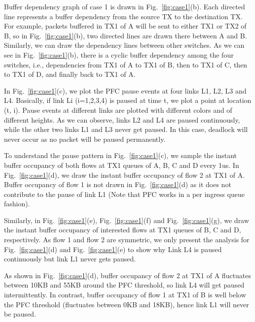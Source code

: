Buffer dependency graph of case 1 is drawn in Fig.~\ref{fig:case1}(b). Each directed line represents a buffer dependency from the source TX to the destination TX. For example, packets buffered in TX1 of A will be sent to either TX1 or TX2 of B, so in Fig.~\ref{fig:case1}(b), two directed lines are drawn there between A and B. Similarly, we can draw the dependency lines between other switches. As we can see in Fig.~\ref{fig:case1}(b), there is a cyclic buffer dependency among the four switches, i.e., dependencies from TX1 of A to TX1 of B, then to TX1 of C, then to TX1 of D, and finally back to TX1 of A.

In Fig.~\ref{fig:case1}(c), we plot the PFC pause events at four links L1, L2, L3 and L4. Basically, if link Li (i=1,2,3,4) is paused at time t, we plot a point at location (t, i). Pause events at different links are plotted with different colors and of different heights. As we can observe, links L2 and L4 are paused continuously, while the other two links L1 and L3 never get paused. In this case, deadlock will never occur as no packet will be paused permanently.

To understand the pause pattern in Fig.~\ref{fig:case1}(c), we sample the instant buffer occupancy of both flows at TX1 queues of A, B, C and D every 1us. In Fig.~\ref{fig:case1}(d), we draw the instant buffer occupancy of flow 2 at TX1 of A. Buffer occupancy of flow 1 is not drawn in Fig.~\ref{fig:case1}(d) as it does not contribute to the pause of link L1 (Note that PFC works in a per ingress queue fashion). 

Similarly, in Fig.~\ref{fig:case1}(e), Fig.~\ref{fig:case1}(f) and Fig.~\ref{fig:case1}(g), we draw the instant buffer occupancy of interested flows at TX1 queues of B, C and D, respectively. As flow 1 and flow 2 are symmetric, we only present the analysis for Fig.~\ref{fig:case1}(d) and Fig.~\ref{fig:case1}(e) to show why Link L4 is paused continuously but link L1 never gets paused.

As shown in Fig.~\ref{fig:case1}(d), buffer occupancy of flow 2 at TX1 of A fluctuates between 10KB and 55KB around the PFC threshold, so link L4 will get paused intermittently. In contrast, buffer occupancy of flow 1 at TX1 of B is well below the PFC threshold (fluctuates between 0KB and 18KB), hence link L1 will never be paused.

